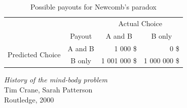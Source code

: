 \documentclass[a4paper]{article}
\begin{document}

		\begin{table}[htbp]
			\centering
			\begin{tabular}{c|c|r|r|}
				\multicolumn{1}{c}{} & \multicolumn{1}{c}{} & \multicolumn{2}{c}{Actual Choice} \\
				\cline{2-4}
				& Payout & \multicolumn{1}{|c|}{A and B} & \multicolumn{1}{|c|}{B only} \\
				\cline{2-4}
				\multirow{2}{*}{Predicted Choice} & A and B & 1 000 \$ & 0 \$ \\
				\cline{2-4}
				& B only & 1 001 000 \$ & 1 000 000 \$ \\
				\cline{2-4}
			\end{tabular}
			\caption{Possible payouts for Newcomb's paradox}
			\label{table:NewcombParadoxPayouts}
		\end{table}

	\begin{thebibliography}{}

			\emph{History of the mind-body problem}\\
			Tim Crane, Sarah Patterson\\
			Routledge, 2000

	\end{thebibliography}
\end{document}
